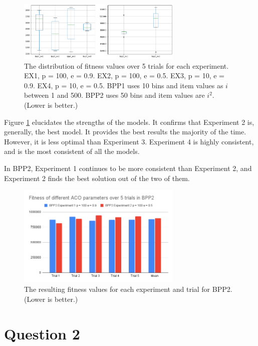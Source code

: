 \documentclass[a4paper, 11pt]{article}
\begin{document}
\begin{figure}[h]
    \centering
    \includegraphics[width=0.7\textwidth]{figs/experiment boxplots.png}
    \caption{The distribution of fitness values over 5 trials for each experiment. EX1, p = 100, e = 0.9. EX2, p = 100, e = 0.5. EX3, p = 10, e = 0.9. EX4, p = 10, e = 0.5. BPP1 uses 10 bins and item values as $i$ between 1 and 500. BPP2 uses 50 bins and item values are $i^2$. (Lower is better.)}
    \label{boxplots}
\end{figure}

Figure \ref{boxplots} elucidates the strengths of the models. It confirms that Experiment 2 is, generally, the best model. It provides the best results the majority of the time. However, it is less optimal than Experiment 3. Experiment 4 is highly consistent, and is the most consistent of all the models.

In BPP2, Experiment 1 continues to be more consistent than Experiment 2, and Experiment 2 finds the best solution out of the two of them.

\begin{figure}[h]
    \centering
    \includegraphics[width=0.7\textwidth]{figs/bpp2 fitness bar charts.png}
    \caption{The resulting fitness values for each experiment and trial for BPP2. (Lower is better.)}
    \label{bpp2-bar-chart}
\end{figure}

\section{Question 2}
\end{document}
